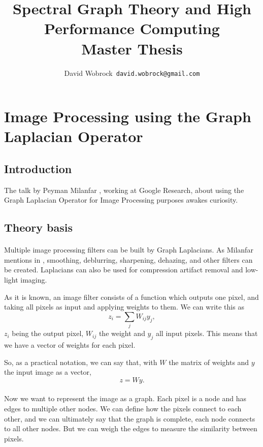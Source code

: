 \documentclass[]{article}
\title{Spectral Graph Theory and High Performance Computing \\ Master Thesis}
\author{David Wobrock\ \texttt{david.wobrock@gmail.com}}
\begin{document}
\begin{titlepage}
 \maketitle
\end{titlepage}

\tableofcontents
\newpage

\section{Image Processing using the Graph Laplacian Operator}

\subsection{Introduction}

The talk by Peyman Milanfar \cite{siam_slides_2016}, working at Google Research, about using the Graph Laplacian Operator for Image Processing purposes awakes curiosity.

\subsection{Theory basis}

\paragraph{}
Multiple image processing filters can be built by Graph Laplacians. As Milanfar mentions in \cite{siam_slides_2016}, smoothing, deblurring, sharpening, dehazing, and other filters can be created. Laplacians can also be used for compression artifact removal and low-light imaging.

As it is known, an image filter consists of a function which outputs one pixel, and taking all pixels as input and applying weights to them. We can write this as
\[z_i = \sum_j W_{ij}y_j,\]
\(z_i\) being the output pixel, \(W_{ij}\) the weight and \(y_j\) all input pixels.
This means that we have a vector of weights for each pixel.

So, as a practical notation, we can say that, with \(W\) the matrix of weights and \(y\) the input image as a vector,
\[z = Wy.\]

\paragraph{}
Now we want to represent the image as a graph.
Each pixel is a node and has edges to multiple other nodes.
We can define how the pixels connect to each other, and we can ultimately say that the graph is complete, each node connects to all other nodes.
But we can weigh the edges to measure the similarity between pixels.
\end{document}
